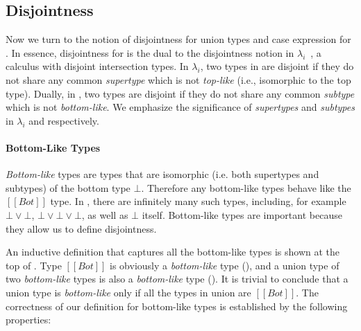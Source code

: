 \subsection{Disjointness}
\label{sec:union:disj}
Now we turn to the notion of disjointness for
union types and case expression for \cal. In essence, disjointness for \cal is
the dual to the disjointness notion in $\lambda_i$~\cite{oliveira2016disjoint},
a calculus with disjoint intersection types.
In $\lambda_i$, two
types in are disjoint if they do not share any common
\emph{supertype} which is not \emph{top-like} (i.e., isomorphic to the top type). Dually, in
\cal, two types are disjoint if they do not share any common \emph{subtype} which
is not \emph{bottom-like}.
We emphasize the significance of
\emph{supertypes} and \emph{subtypes} in $\lambda_i$ and \cal
respectively.

\paragraph{Bottom-Like Types}
\emph{Bottom-like} types are types that are isomorphic (i.e.
both supertypes and subtypes) of the bottom type $\bot$. Therefore
any bottom-like types behave like the $[[Bot]]$ type.
In \name, there
are infinitely many such types, including, for example $\bot \lor \bot$,
$\bot \lor \bot \lor \bot$, as well as $\bot$ itself. Bottom-like types
are important because they allow us to define disjointness.

An inductive definition that captures all the bottom-like types
is shown at the top of .
Type $[[Bot]]$ is obviously a \emph{bottom-like} type
(), and a union type of two \emph{bottom-like} types is also
a \emph{bottom-like} type ().  It is trivial to conclude
that a union type is \emph{bottom-like} only if all the 
types in union are $[[Bot]]$. The correctness of our definition for
bottom-like types is established by the following properties:


